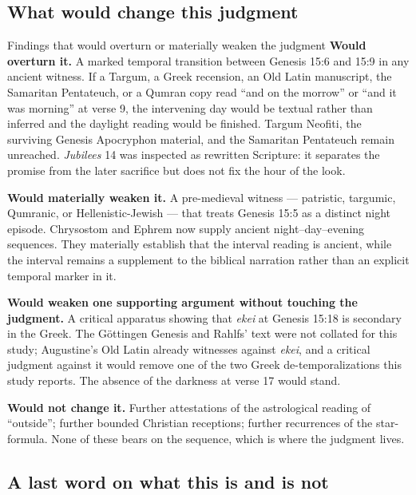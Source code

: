 \subsection{What would change this judgment}

\begin{studybox}{Findings that would overturn or materially weaken the judgment}
\textbf{Would overturn it.} A marked temporal transition between Genesis 15:6
and 15:9 in any ancient witness. If a Targum, a Greek recension, an Old Latin
manuscript, the Samaritan Pentateuch, or a Qumran copy read ``and on the morrow''
or ``and it was morning'' at verse 9, the intervening day would be textual rather
than inferred and the daylight reading would be finished. Targum Neofiti, the
surviving Genesis Apocryphon material, and the Samaritan Pentateuch remain
unreached. \textit{Jubilees} 14 was inspected as rewritten Scripture: it
separates the promise from the later sacrifice but does not fix the hour of the
look.

\textbf{Would materially weaken it.} A pre-medieval witness --- patristic,
targumic, Qumranic, or Hellenistic-Jewish --- that treats Genesis 15:5 as a
distinct night episode. Chrysostom and Ephrem now supply ancient
night--day--evening sequences. They materially establish that the interval
reading is ancient, while the interval remains a supplement to the biblical
narration rather than an explicit temporal marker in it.

\textbf{Would weaken one supporting argument without touching the judgment.} A
critical apparatus showing that \textit{ekei} at Genesis 15:18 is secondary in
the Greek. The Göttingen Genesis and Rahlfs' text were not collated for this
study; Augustine's Old Latin already witnesses against \textit{ekei}, and a
critical judgment against it would remove one of the two Greek de-temporalizations
this study reports. The absence of the darkness at verse 17 would stand.

\textbf{Would not change it.} Further attestations of the astrological reading of
``outside''; further bounded Christian receptions; further recurrences of the
star-formula. None of these bears on the sequence, which is where the judgment
lives.
\end{studybox}

\subsection{A last word on what this is and is not}

